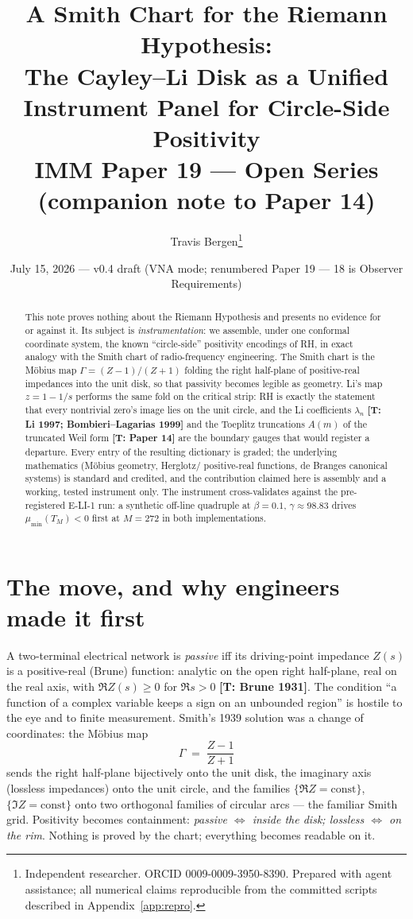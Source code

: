 \documentclass[11pt]{article}
\title{A Smith Chart for the Riemann Hypothesis:\\
\large The Cayley--Li Disk as a Unified Instrument Panel for Circle-Side Positivity\\[4pt]
\normalsize IMM Paper 19 --- Open Series (companion note to Paper 14)}
\author{Travis Bergen\thanks{Independent researcher. ORCID 0009-0009-3950-8390.
Prepared with agent assistance; all numerical claims reproducible from the committed
scripts described in Appendix~\ref{app:repro}.}}
\date{July 15, 2026 --- v0.4 draft (VNA mode; renumbered Paper 19 --- 18 is Observer Requirements)}
\theoremstyle{remark}
\newcommand{\gr}[1]{\textbf{[#1]}} %
\begin{document}
\maketitle

\begin{abstract}
\noindent This note proves nothing about the Riemann Hypothesis and presents no evidence for
or against it. Its subject is \emph{instrumentation}: we assemble, under one conformal
coordinate system, the known ``circle-side'' positivity encodings of RH, in exact analogy
with the Smith chart of radio-frequency engineering. The Smith chart is the M\"obius map
$\Gamma=(Z-1)/(Z+1)$ folding the right half-plane of positive-real impedances into the unit
disk, so that passivity becomes legible as geometry. Li's map $z=1-1/s$ performs the same
fold on the critical strip: RH is exactly the statement that every nontrivial zero's image
lies on the unit circle, and the Li coefficients $\lambda_n$ \gr{T: Li 1997;
Bombieri--Lagarias 1999} and the Toeplitz truncations $A(m)$ of the truncated Weil form
\gr{T: Paper 14} are the boundary gauges that would register a departure. Every entry of the
resulting dictionary is graded; the underlying mathematics (M\"obius geometry, Herglotz/
positive-real functions, de Branges canonical systems) is standard and credited, and the
contribution claimed here is assembly and a working, tested instrument only. The instrument
cross-validates against the pre-registered E-LI-1 run: a synthetic off-line quadruple at
$\beta=0.1$, $\gamma\approx98.83$ drives $\mu_{\min}(T_M)<0$ first at $M=272$ in both
implementations.
\end{abstract}

\section{The move, and why engineers made it first}

A two-terminal electrical network is \emph{passive} iff its driving-point impedance $Z(s)$
is a positive-real (Brune) function: analytic on the open right half-plane, real on the real
axis, with $\Re Z(s)\ge 0$ for $\Re s>0$ \gr{T: Brune 1931}. The condition ``a function of a
complex variable keeps a sign on an unbounded region'' is hostile to the eye and to finite
measurement. Smith's 1939 solution was a change of coordinates: the M\"obius map
\begin{equation}
\Gamma \;=\; \frac{Z-1}{Z+1}
\end{equation}
sends the right half-plane bijectively onto the unit disk, the imaginary axis (lossless
impedances) onto the unit circle, and the families $\{\Re Z=\text{const}\}$,
$\{\Im Z=\text{const}\}$ onto two orthogonal families of circular arcs --- the familiar
Smith grid. Positivity becomes containment: \emph{passive $\Leftrightarrow$ inside the disk;
lossless $\Leftrightarrow$ on the rim}. Nothing is proved by the chart; everything becomes
readable on it.
\end{document}
